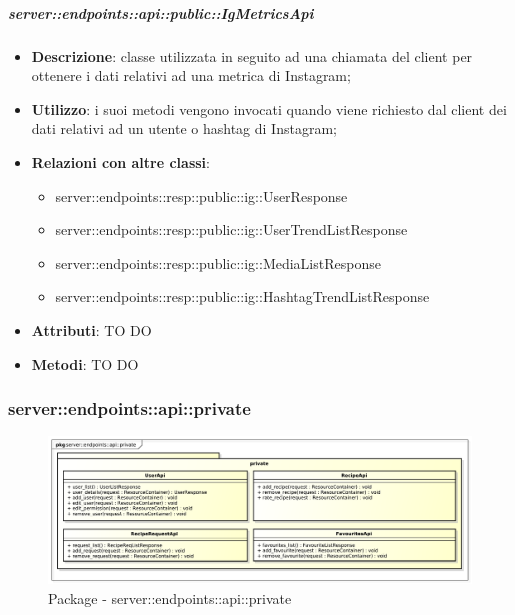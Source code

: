     \subparagraph{server::endpoints::api::public::IgMetricsApi} %
    \label{subp:bdsm_app_server_endpoints_api_public_igmetricsapi}
    \begin{itemize}
      \item \textbf{Descrizione}: classe utilizzata in seguito ad una chiamata del client per ottenere i dati relativi ad una metrica di Instagram;
      \item \textbf{Utilizzo}: i suoi metodi vengono invocati quando viene richiesto dal client dei dati relativi ad un utente o hashtag di Instagram;
      \item \textbf{Relazioni con altre classi}:
        \begin{itemize}
          \item server::endpoints::resp::public::ig::UserResponse
          \item server::endpoints::resp::public::ig::UserTrendListResponse
          \item server::endpoints::resp::public::ig::MediaListResponse
          \item server::endpoints::resp::public::ig::HashtagTrendListResponse
        \end{itemize}
		\item \textbf{Attributi}: TO DO
		\item \textbf{Metodi}: TO DO
      \end{itemize}

\subsubsection{server::endpoints::api::private} %
\label{ssub:bdsm_app_server_endpoints_api_private}
\begin{figure}[!htbp]
	\centering
	\centerline{\includegraphics[scale=0.4]{./images/server/api_private.pdf}}
	\caption{Package - server::endpoints::api::private}
\end{figure}

